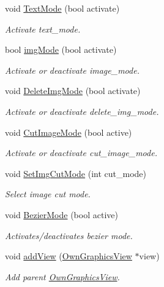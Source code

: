 \begin{DoxyCompactItemize}
void \mbox{\hyperlink{classOwnGraphicsScene_a6dd98dd7fd32a22016f4f8d4d6a8f400}{Text\+Mode}} (bool activate)
\begin{DoxyCompactList}\small\item\em Activate text\+\_\+mode. \end{DoxyCompactList}\item 
bool \mbox{\hyperlink{classOwnGraphicsScene_acc6e7978a3f10889e439ceabd155a341}{img\+Mode}} (bool activate)
\begin{DoxyCompactList}\small\item\em Activate or deactivate image\+\_\+mode. \end{DoxyCompactList}\item 
void \mbox{\hyperlink{classOwnGraphicsScene_aefe52a5b20dbb38dcc9d9510ecfabe52}{Delete\+Img\+Mode}} (bool activate)
\begin{DoxyCompactList}\small\item\em Activate or deactivate delete\+\_\+img\+\_\+mode. \end{DoxyCompactList}\item 
void \mbox{\hyperlink{classOwnGraphicsScene_a3ce5a34cebcc134ecb20323c48e5812b}{Cut\+Image\+Mode}} (bool active)
\begin{DoxyCompactList}\small\item\em Activate or deactivate cut\+\_\+image\+\_\+mode. \end{DoxyCompactList}\item 
void \mbox{\hyperlink{classOwnGraphicsScene_a656919c9fdd0827ae182d3d3f5f91e4f}{Set\+Img\+Cut\+Mode}} (int cut\+\_\+mode)
\begin{DoxyCompactList}\small\item\em Select image cut mode. \end{DoxyCompactList}\item 
\mbox{\label{classOwnGraphicsScene_a8d2bbcfd1b3d28ca45802e53b046fe49}} 
void \mbox{\hyperlink{classOwnGraphicsScene_a8d2bbcfd1b3d28ca45802e53b046fe49}{Bezier\+Mode}} (bool active)
\begin{DoxyCompactList}\small\item\em Activates/deactivates bezier mode. \end{DoxyCompactList}\item 
void \mbox{\hyperlink{classOwnGraphicsScene_a8677d9cbb1f01943c303be0985c84fbe}{add\+View}} (\mbox{\hyperlink{classOwnGraphicsView}{Own\+Graphics\+View}} $\ast$view)
\begin{DoxyCompactList}\small\item\em Add parent \mbox{\hyperlink{classOwnGraphicsView}{Own\+Graphics\+View}}. \end{DoxyCompactList}\item 

\end{DoxyCompactItemize}
